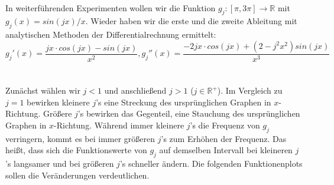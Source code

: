 \documentclass{scrartcl}
\begin{document}
 \\
In weiterführenden Experimenten wollen wir die Funktion $g_j:[\pi, 3\pi] \rightarrow \mathbb{R}$ mit $g_j(x) = sin(j x)/x$. Wieder haben wir die erste und die zweite Ableitung mit analytischen Methoden der Differentialrechnung ermittelt: \\
\[g_j'(x) = \frac{jx \cdot cos(jx) - sin(jx)}{x^{2}}, g_j''(x) = \frac{-2jx \cdot cos(jx) + (2-j^{2}x^{2}) sin(jx)}{x^{3}} \] \\
\\
Zunächst wählen wir $j<1$ und anschließend $j>1$ ($j \in \mathbb{R^{+}}$). Im Vergleich zu $j = 1$ bewirken kleinere $j$'s eine Streckung des ursprünglichen Graphen in $x$-Richtung. Größere $j$'s bewirken das Gegenteil, eine Stauchung des ursprünglichen Graphen in $x$-Richtung. Während immer kleinere $j$'s die Frequenz von $g_j$ verringern, kommt es bei immer größeren $j$'s zum Erhöhen der Frequenz. Das heißt, dass sich die Funktionswerte von $g_j$ auf demselben Intervall bei kleineren $j$'s langsamer und bei größeren $j$'s schneller ändern. Die folgenden Funktionenplots sollen die Veränderungen verdeutlichen.
\end{document}
